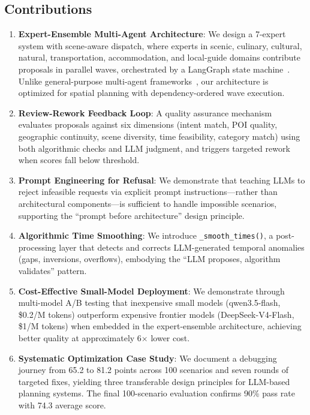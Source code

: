 \subsection{Contributions}

\begin{enumerate}[leftmargin=*]
    \item \textbf{Expert-Ensemble Multi-Agent Architecture}: We design a 7-expert system with scene-aware dispatch, where experts in scenic, culinary, cultural, natural, transportation, accommodation, and local-guide domains contribute proposals in parallel waves, orchestrated by a LangGraph state machine~\cite{langgraph2024}. Unlike general-purpose multi-agent frameworks~\cite{wu2023autogen,crewai2024}, our architecture is optimized for spatial planning with dependency-ordered wave execution.

    \item \textbf{Review-Rework Feedback Loop}: A quality assurance mechanism evaluates proposals against six dimensions (intent match, POI quality, geographic continuity, scene diversity, time feasibility, category match) using both algorithmic checks and LLM judgment, and triggers targeted rework when scores fall below threshold.

    \item \textbf{Prompt Engineering for Refusal}: We demonstrate that teaching LLMs to reject infeasible requests via explicit prompt instructions---rather than architectural components---is sufficient to handle impossible scenarios, supporting the ``prompt before architecture'' design principle.

    \item \textbf{Algorithmic Time Smoothing}: We introduce \texttt{\_smooth\_times()}, a post-processing layer that detects and corrects LLM-generated temporal anomalies (gaps, inversions, overflows), embodying the ``LLM proposes, algorithm validates'' pattern.

    \item \textbf{Cost-Effective Small-Model Deployment}: We demonstrate through multi-model A/B testing that inexpensive small models (qwen3.5-flash, \$0.2/M tokens) outperform expensive frontier models (DeepSeek-V4-Flash, \$1/M tokens) when embedded in the expert-ensemble architecture, achieving better quality at approximately 6$\times$ lower cost.

    \item \textbf{Systematic Optimization Case Study}: We document a debugging journey from 65.2 to 81.2 points across 100 scenarios and seven rounds of targeted fixes, yielding three transferable design principles for LLM-based planning systems. The final 100-scenario evaluation confirms 90\% pass rate with 74.3 average score.
\end{enumerate}
